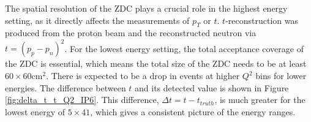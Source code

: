 \documentclass[
]{report}
\begin{document}


The spatial resolution of the ZDC plays a crucial role in the highest
energy setting, as it directly affects the measurements of \(p_T\) or
\(t\). \(t\)-reconstruction was produced from the proton beam and the
reconstructed neutron via \(t=(p_p-p_n)^2\). For the lowest energy
setting, the total acceptance coverage of the ZDC is essential, which
means the total size of the ZDC needs to be at least
\(60\times 60 \mathrm{cm}^2\). There is expected to be a drop in events
at higher \(Q^2\) bins for lower energies. The difference between \(t\)
and its detected value is shown in Figure \ref{fig:delta_t_t_Q2_IP6}.
This difference, \(\Delta{t}=t-t_{truth}\), is much greater for the
lowest energy of \(5\times41\), which gives a consistent picture of the
energy ranges.
\end{document}
